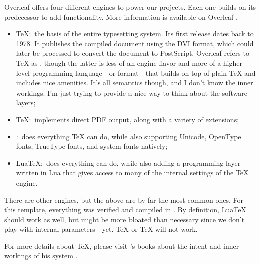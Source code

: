Overleaf offers four different engines to power our projects. Each one builds on its predecessor to add functionality. More information is available on Overleaf \parencite{web:overleaf-tex-family-tree}.

\begin{itemize}
    \item \TeX{}:~the basis of the entire typesetting system. Its first release dates back to 1978. It publishes the compiled document using the \gls{DVI} format, which could later be processed to convert the document to PostScript. Overleaf refers to \TeX{} as \guil{\LaTeX}, though the latter is less of an engine flavor and more of a higher-level programming language---or format---that builds on top of plain \TeX{} and includes nice amenities. It's all semantics though, and I don't know the inner workings. I'm just trying to provide a nice way to think about the software layers;
    \item {}\TeX{}:~implements direct \gls{PDF} output, along with a variety of extensions;
    \item {}:~does everything \TeX{} can do, while also supporting Unicode, OpenType fonts, TrueType fonts, and system fonts natively;
    \item Lua\TeX:~does everything  can do, while also adding a programming layer written in Lua that gives access to many of the internal settings of the \TeX{} engine.
\end{itemize}

\noindent There are other engines, but the above are by far the most common ones. For this template, everything was verified and compiled in . By definition, Lua\TeX{} should work as well, but might be more bloated than necessary since we don't play with internal parameters---yet. \TeX{} or \TeX{} will not work.

For more details about \TeX{}, please visit 's books about the intent and inner workings of his system \parencites{book:knuth-tex-metafont,book:knuth-typesetting-a,book:knuth-typesetting-c}. 